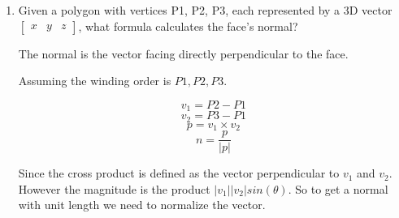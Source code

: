 \documentclass{article}
\begin{document}
\begin{enumerate}
        \item Given a polygon with vertices P1, P2, P3, each represented by a 3D vector $\begin{bmatrix} x & y & z\end{bmatrix}$,
            what formula calculates the face’s normal?

            \begin{mdframed}
                The normal is the vector facing directly perpendicular to the face.

                Assuming the winding order is $P1, P2, P3$.

                \begin{displaymath}
                    v_1 = P2 - P1
                \end{displaymath}
                \begin{displaymath}
                    v_2 = P3 - P1
                \end{displaymath}
                \begin{displaymath}
                    p = v_1 \times v_2
                \end{displaymath}
                \begin{displaymath}
                    n = \frac{p}{|p|}
                \end{displaymath}

                Since the cross product is defined as the vector perpendicular to
                $v_1$ and $v_2$. However the magnitude is the product 
                $|v_1| |v_2| sin(\theta)$. So to get a normal with unit length
                we need to normalize the vector.
            \end{mdframed}
    \end{enumerate}
\end{document}
